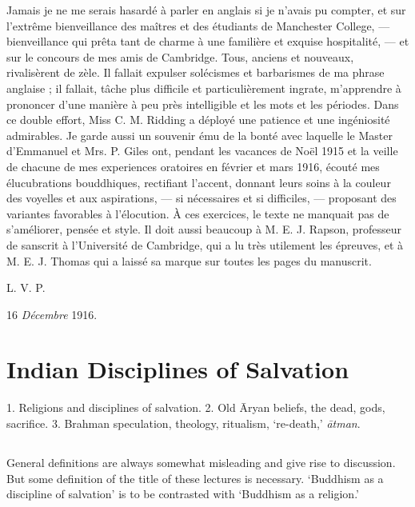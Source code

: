 \documentclass[a4paper, 11pt, oneside, english, landscape]{article}
\begin{document}
Jamais je ne me serais hasardé à parler en anglais si je n'avais pu compter, et sur l'extrême bienveillance des maîtres et des étudiants de Manchester College, --- bienveillance qui prêta tant de charme à une familière et exquise hospitalité, --- et sur le concours de mes amis de Cambridge. Tous, anciens et nouveaux, rivalisèrent de zèle. Il fallait expulser solécismes et barbarismes de ma phrase anglaise ; il fallait, tâche plus difficile et particulièrement ingrate, m'apprendre à prononcer d'une manière à peu près intelligible et les mots et les périodes. Dans ce double effort, Miss C. M. Ridding a déployé une patience et une ingéniosité admirables. Je garde aussi un souvenir ému de la bonté avec laquelle le Master d'Emmanuel et Mrs. P. Giles ont, pendant les vacances de Noël 1915 et la veille de chacune de mes experiences oratoires en février et mars 1916, écouté mes élucubrations bouddhiques, rectifiant l'accent, donnant leurs soins à la couleur des voyelles et aux aspirations, --- si nécessaires et si difficiles, --- proposant des variantes favorables à l'élocution. À ces exercices, le texte ne manquait pas de s'améliorer, pensée et style. Il doit aussi beaucoup à M. E. J. Rapson, professeur de sanscrit à l'Université de Cambridge, qui a lu très utilement les épreuves, et à M. E. J. Thomas qui a laissé sa marque sur toutes les pages du manuscrit.

\bigskip

L. V. P.

\bigskip

16 \emph{Décembre} 1916.
\clearpage
\section{Indian Disciplines of Salvation}
\begin{center}\footnotesize
1. Religions and disciplines of salvation. 2. Old Āryan beliefs, the dead, gods, sacrifice. 3. Brahman speculation, theology, ritualism, `re-death,' \emph{ātman}.
\end{center}
\subsection{}
\paragraph{}
General definitions are always somewhat misleading and give rise to discussion. But some definition of the title of these lectures is necessary. `Buddhism as a discipline of salvation' is to be contrasted with `Buddhism as a religion.'
\end{document}
